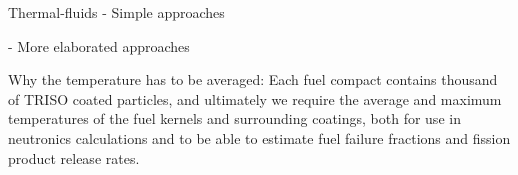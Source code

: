 Thermal-fluids
- Simple approaches

- More elaborated approaches































Why the temperature has to be averaged:
Each fuel compact contains thousand of TRISO coated particles, and ultimately we require the average and maximum temperatures of the fuel kernels and surrounding coatings, both for use in neutronics calculations and to be able to estimate fuel failure fractions and fission product release rates.
